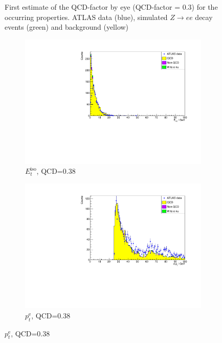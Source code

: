 \documentclass[11pt,a4paper,notitlepage]{scrartcl}
\begin{document}
\begin{figure}[H]
\begin{subfigure}{0.49\linewidth}
		\caption{}
	\end{subfigure}
	\caption{First estimate of the QCD-factor by eye (QCD-factor = $0.3$) for the occurring properties. ATLAS data (blue), simulated $Z\to ee$ decay events (green) and background (yellow)}\label{fig:eyeballed_cuts}
\end{figure}
\begin{figure}[H]
	\centering
	\begin{subfigure}{0.49\linewidth}
		\includegraphics[width=\linewidth]{P1_pics/cuts/el_etiso_qcd_038.pdf}
		\caption{$E_t^{\text{iso}}$, QCD=$0.38$}
	\end{subfigure}
	\begin{subfigure}{0.49\linewidth}
		\includegraphics[width=\linewidth]{P1_pics/cuts/el_pt_qcd_038.pdf}
		\caption{$p_t^{\text{e}}$, QCD=$0.38$}

\end{subfigure}
\end{figure}
\end{document}
